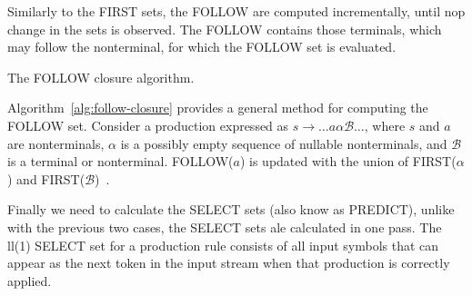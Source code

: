 Similarly to the FIRST sets, the FOLLOW are computed incrementally, until nop change in the sets is observed. The FOLLOW contains those terminals, which may follow the nonterminal, for which the FOLLOW set is evaluated. 

\begingroup
\vspace{1.5em}
\begin{algorithm}[H]
  \setlength{\algomargin}{1.5em}

  \caption{The FOLLOW closure algorithm.}
  \label{alg:follow-closure}
\end{algorithm}
\vspace{1.5em}
\endgroup
Algorithm~\ref{alg:follow-closure} provides a general method for computing the FOLLOW set. Consider a production expressed as $s \rightarrow \dots a \alpha \mathcal{B}\dots$, where $s$ and $a$ are nonterminals, $\alpha$ is a possibly empty sequence of nullable nonterminals, and $\mathcal{B}$ is a terminal or nonterminal. FOLLOW($a$) is updated with the union of FIRST($\alpha$) and FIRST($\mathcal{B}$)~\cite[Chapter~4.7.2]{Holub_1990}.

Finally we need to calculate the SELECT sets (also know as PREDICT), unlike with the previous two cases, the SELECT sets ale calculated in one pass. The \gls{ll}(1) SELECT set for a production rule consists of all input symbols that can appear as the next token in the input stream when that production is correctly applied.



